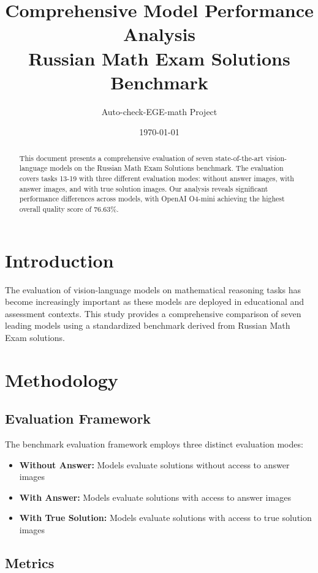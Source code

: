 \documentclass[11pt]{article}
\title{Comprehensive Model Performance Analysis\\
Russian Math Exam Solutions Benchmark}
\author{Auto-check-EGE-math Project}
\date{\today}
\begin{document}
\maketitle

\begin{abstract}
This document presents a comprehensive evaluation of seven state-of-the-art vision-language models on the Russian Math Exam Solutions benchmark. The evaluation covers tasks 13-19 with three different evaluation modes: without answer images, with answer images, and with true solution images. Our analysis reveals significant performance differences across models, with OpenAI O4-mini achieving the highest overall quality score of 76.63\%.
\end{abstract}

\section{Introduction}

The evaluation of vision-language models on mathematical reasoning tasks has become increasingly important as these models are deployed in educational and assessment contexts. This study provides a comprehensive comparison of seven leading models using a standardized benchmark derived from Russian Math Exam solutions.

\section{Methodology}

\subsection{Evaluation Framework}

The benchmark evaluation framework employs three distinct evaluation modes:

\begin{itemize}
\item \textbf{Without Answer:} Models evaluate solutions without access to answer images
\item \textbf{With Answer:} Models evaluate solutions with access to answer images
\item \textbf{With True Solution:} Models evaluate solutions with access to true solution images
\end{itemize}

\subsection{Metrics}
\end{document}
